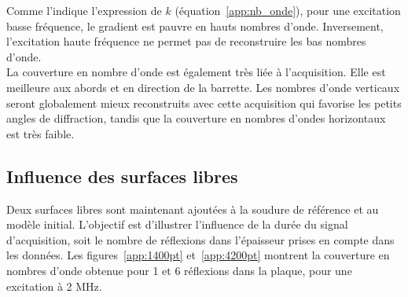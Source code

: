 Comme l'indique l'expression de $k$ (équation~\ref{app:nb_onde}), pour une excitation basse fréquence, le gradient est pauvre en hauts nombres d'onde. Inversement, l'excitation haute fréquence ne permet pas de reconstruire les bas nombres d'onde.\\
La couverture en nombre d'onde est également très liée à l'acquisition. Elle est meilleure aux abords et en direction de la barrette. Les nombres d'onde verticaux seront globalement mieux reconstruits avec cette acquisition qui favorise les petits angles de diffraction, tandis que la couverture en nombres d'ondes horizontaux est très faible.

\subsection{Influence des surfaces libres}

Deux surfaces libres sont maintenant ajoutées à la soudure de référence et au modèle initial. L'objectif est d'illustrer l'influence de la durée du signal d'acquisition, soit le nombre de réflexions dans l'épaisseur prises en compte dans les données. Les figures~\ref{app:1400pt} et~\ref{app:4200pt} montrent la couverture en nombres d'onde obtenue  pour 1 et 6 réflexions dans la plaque, pour une excitation à 2 MHz.

